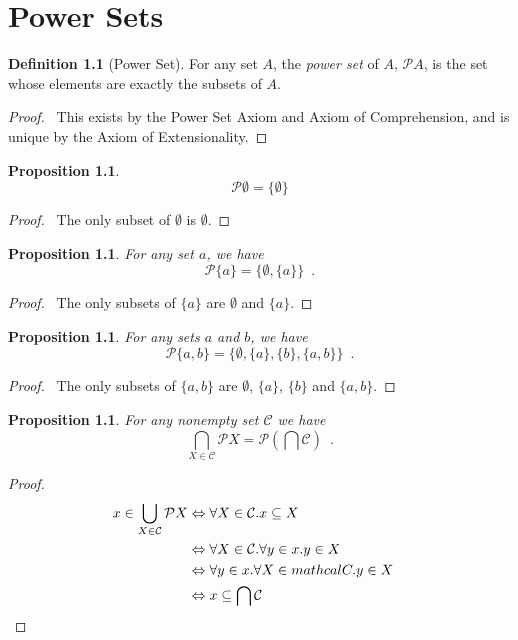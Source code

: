 \documentclass{report}
\let\qed\relax
\newtheorem{prop}[ax]{Proposition}
\theoremstyle{definition}
\newtheorem{df}[ax]{Definition}
\begin{document}
\chapter{Power Sets}

\begin{df}[Power Set]
For any set $A$, the \emph{power set} of $A$, $\mathcal{P} A$, is the set whose elements are exactly the subsets of $A$.
\end{df}

\begin{proof}
\pf\ This exists by the Power Set Axiom and Axiom of Comprehension, and is unique by the Axiom of Extensionality. \qed
\end{proof}

\begin{prop}
\[ \mathcal{P} \emptyset = \{ \emptyset \} \]
\end{prop}

\begin{proof}
\pf\ The only subset of $\emptyset$ is $\emptyset$. \qed
\end{proof}

\begin{prop}
For any set $a$, we have
\[ \mathcal{P} \{ a \} = \{ \emptyset, \{ a \} \} \enspace . \]
\end{prop}

\begin{proof}
\pf\ The only subsets of $\{a\}$ are $\emptyset$ and $\{a\}$. \qed
\end{proof}

\begin{prop}
For any sets $a$ and $b$, we have
\[ \mathcal{P} \{ a,b \} = \{ \emptyset, \{a\}, \{b\}, \{a,b\} \} \enspace . \]
\end{prop}

\begin{proof}
\pf\ The only subsets of $\{a,b\}$ are $\emptyset$, $\{a\}$, $\{b\}$ and $\{a,b\}$. \qed
\end{proof}

\begin{prop}
For any nonempty set $\mathcal{C}$ we have
\[ \bigcap_{X \in \mathcal{C}} \mathcal{P} X = \mathcal{P} \left( \bigcap \mathcal{C} \right) \enspace . \]
\end{prop}

\begin{proof}
\pf
\begin{align*}
x \in \bigcup_{X \in \mathcal{C}} \mathcal{P} X
& \Leftrightarrow \forall X \in \mathcal{C}. x \subseteq X \\
& \Leftrightarrow \forall X \in \mathcal{C}. \forall y \in x. y \in X \\
& \Leftrightarrow \forall y \in x. \forall X \in mathcal{C}. y \in X \\
& \Leftrightarrow x \subseteq \bigcap \mathcal{C} & \qed
\end{align*}
\end{proof}
\end{document}

